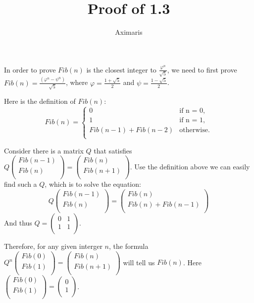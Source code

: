\documentclass[utf-8]{article}
\title{Proof of 1.3}
\author{Aximaris}
\date{}
\begin{document}
\maketitle

In order to prove $Fib(n)$ is the closest integer to
$\frac{\varphi^n}{\sqrt{5}}$, we need to first prove $Fib(n) =
\frac{\left(\varphi^n-\psi^n\right)}{\sqrt{5}}$, where
$\varphi=\frac{1+\sqrt{5}}{2}$ and $\psi=\frac{1-\sqrt{5}}{2}$.

Here is the definition of $Fib(n)$:
\begin{equation}
  \label{}
  Fib(n) =
  \begin{cases}
    0 & \mbox{if n = 0,} \\
    1 & \mbox{if n = 1,} \\
    Fib(n-1)+Fib(n-2) & \mbox{otherwise.} \\
  \end{cases}
\end{equation}

Consider there is a matrix $Q$ that satisfies $Q
\begin{pmatrix}
  Fib(n-1) \\
  Fib(n)   \\
\end{pmatrix} =
\begin{pmatrix}
  Fib(n)   \\
  Fib(n+1) \\
\end{pmatrix}
$. Use the definition above we can easily find such a $Q$, which is to
solve the equation:
\[
Q \begin{pmatrix}
    Fib(n-1) \\
    Fib(n)   \\
  \end{pmatrix}=
  \begin{pmatrix}
    Fib(n) \\
    Fib(n)+Fib(n-1) \\
  \end{pmatrix}
\]
And thus $Q=
\begin{pmatrix}
  0 & 1 \\
  1 & 1 \\
\end{pmatrix}
$.

Therefore, for any given interger $n$, the formula $Q^n
\begin{pmatrix}
  Fib(0) \\
  Fib(1) \\
\end{pmatrix}=
\begin{pmatrix}
  Fib(n) \\
  Fib(n+1) \\
\end{pmatrix}
$ will tell us $Fib(n)$. Here $
\begin{pmatrix}
  Fib(0) \\
  Fib(1) \\
\end{pmatrix}=
\begin{pmatrix}
  0 \\
  1 \\
\end{pmatrix}
$.
\end{document}
